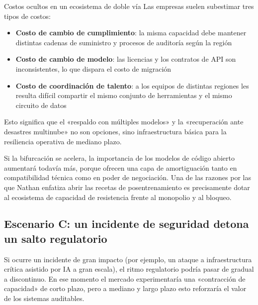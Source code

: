 \documentclass[a4paper]{article}
\begin{document}
\begin{warningbox}{Costos ocultos en un ecosistema de doble vía}
Las empresas suelen subestimar tres tipos de costos:
\begin{itemize}
    \item \textbf{Costo de cambio de cumplimiento}: la misma capacidad debe mantener distintas cadenas de suministro y procesos de auditoría según la región
    \item \textbf{Costo de cambio de modelo}: las licencias y los contratos de API son inconsistentes, lo que dispara el costo de migración
    \item \textbf{Costo de coordinación de talento}: a los equipos de distintas regiones les resulta difícil compartir el mismo conjunto de herramientas y el mismo circuito de datos
\end{itemize}

Esto significa que el «respaldo con múltiples modelos» y la «recuperación ante desastres multinube» no son opciones, sino infraestructura básica para la resiliencia operativa de mediano plazo.
\end{warningbox}

Si la bifurcación se acelera, la importancia de los modelos de código abierto aumentará todavía más, porque ofrecen una capa de amortiguación tanto en compatibilidad técnica como en poder de negociación. Una de las razones por las que Nathan enfatiza abrir las recetas de posentrenamiento es precisamente dotar al ecosistema de capacidad de resistencia frente al monopolio y al bloqueo.

\subsection{Escenario C: un incidente de seguridad detona un salto regulatorio}

Si ocurre un incidente de gran impacto (por ejemplo, un ataque a infraestructura crítica asistido por IA a gran escala), el ritmo regulatorio podría pasar de gradual a discontinuo. En ese momento el mercado experimentaría una «contracción de capacidad» de corto plazo, pero a mediano y largo plazo esto reforzaría el valor de los sistemas auditables.
\end{document}
